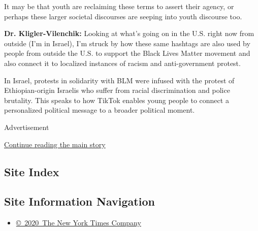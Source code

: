 It may be that youth are reclaiming these terms to assert their agency,
or perhaps these larger societal discourses are seeping into youth
discourse too.

\textbf{Dr. Kligler-Vilenchik:} Looking at what's going on in the U.S.
right now from outside (I'm in Israel), I'm struck by how these same
hashtags are also used by people from outside the U.S. to support the
Black Lives Matter movement and also connect it to localized instances
of racism and anti-government protest.

In Israel, protests in solidarity with BLM were infused with the protest
of Ethiopian-origin Israelis who suffer from racial discrimination and
police brutality. This speaks to how TikTok enables young people to
connect a personalized political message to a broader political moment.

Advertisement

\protect\hyperlink{after-bottom}{Continue reading the main story}

\hypertarget{site-index}{%
\subsection{Site Index}\label{site-index}}

\hypertarget{site-information-navigation}{%
\subsection{Site Information
Navigation}\label{site-information-navigation}}

\begin{itemize}
\tightlist
\item
  \href{https://help.nytimes3xbfgragh.onion/hc/en-us/articles/115014792127-Copyright-notice}{©~2020~The
  New York Times Company}
\end{itemize}

